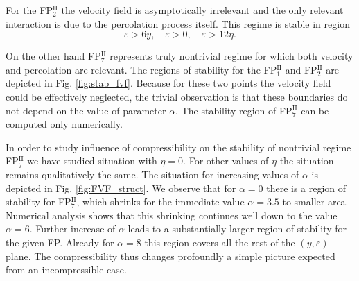 \documentclass[aps,pre,url,twocolumn,superscriptaddress]{revtex4-1}
\def\eps{\varepsilon}
\newcommand{\fp}[2]{FP$^{\textrm{#1}}_{#2}$}
\begin{document}
For the \fp{II}{2}
the velocity field is asymptotically irrelevant and the only 
relevant interaction is due to the percolation process itself. This regime is stable in
region
\begin{equation}
   \eps > 6y, \quad \eps > 0,\quad \eps > 12\eta.
   \label{eq:DP_frozen}
\end{equation}

On the other hand \fp{II}{7} represents truly nontrivial regime for which both velocity and
percolation are relevant. The regions of stability for the \fp{II}{1} and \fp{II}{2} 
are depicted in Fig. \ref{fig:stab_fvf}. Because for these two points
the velocity field could be effectively neglected, the trivial observation is that
these boundaries do not depend on the value of parameter $\alpha$. The stability region
of \fp{II}{7} can be computed only numerically. 

In order to study influence of compressibility on the stability of nontrivial regime
\fp{II}{7} we have studied situation with $\eta=0$. For other values of $\eta$ the situation
remains qualitatively the same. The situation for increasing values of $\alpha$ is depicted
 in Fig. \ref{fig:FVF_struct}. We observe that for $\alpha=0$ there is a region
of stability for \fp{II}{7}, which shrinks for the immediate value $\alpha=3.5$ to smaller
area. Numerical
analysis shows that this shrinking continues well down to the value $\alpha=6$. Further increase
 of $\alpha$ leads to a substantially larger region of stability for the given
FP. Already for $\alpha=8$ this region covers all the rest of the $(y,\eps)$ plane.
The compressibility thus changes profoundly a simple picture expected from an incompressible case.

\end{document}
